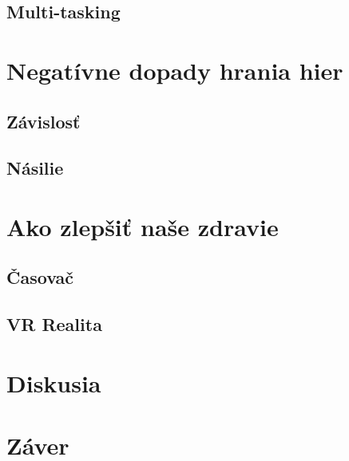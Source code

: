 \documentclass[10pt,twoside,slovak,a4paper]{article}
\begin{document}
\subsection{Multi-tasking}



\section{Negatívne dopady hrania hier}

\subsection{Závislosť}

\subsection{Násilie}



\section{Ako zlepšiť naše zdravie}

\subsection{Časovač}

\subsection{VR Realita}


\section{Diskusia}


\section{Záver}






\end{document}

